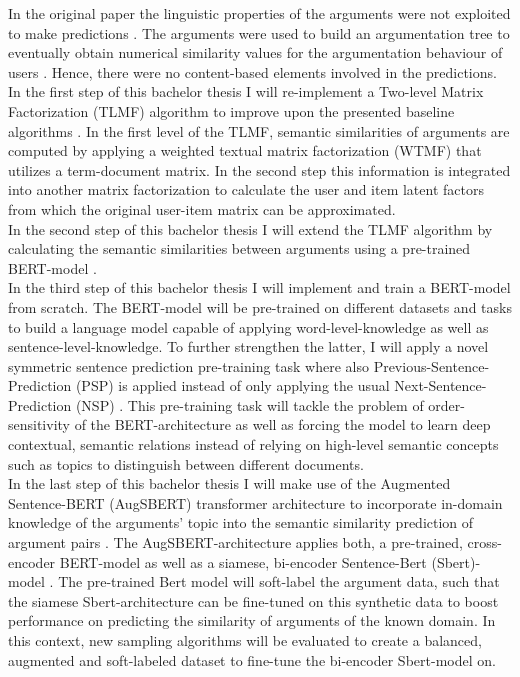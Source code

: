 In the original paper the linguistic properties of the arguments were not exploited to make predictions \cite{HowIArgue}. 
The arguments were used to build an argumentation tree to eventually obtain numerical similarity
values for the argumentation behaviour of users \cite{brenneis2020much}. Hence, there were no content-based elements involved
in the predictions.\\ 
In the first step of this bachelor thesis I will re-implement a Two-level Matrix Factorization (TLMF) algorithm to improve upon the presented baseline algorithms \cite{li2016two}.
In the first level of the TLMF, semantic similarities of arguments are computed by applying a weighted textual matrix factorization (WTMF) that utilizes a term-document matrix.
In the second step this information is integrated into another matrix factorization to calculate the
user and item latent factors from which the original user-item matrix can be approximated.\\
In the second step of this bachelor thesis I will extend the TLMF algorithm by calculating the semantic similarities between arguments using 
a pre-trained BERT-model \cite{devlin2018bert}.\\
In the third step of this bachelor thesis I will implement and train a BERT-model from scratch. The BERT-model will be pre-trained on different datasets and tasks to build a language model 
capable of applying word-level-knowledge as well as sentence-level-knowledge. To further strengthen the latter, I will apply a novel symmetric sentence prediction pre-training 
task where also Previous-Sentence-Prediction (PSP) is applied instead of only applying the usual Next-Sentence-Prediction (NSP) \cite{xu2020symmetric}.
This pre-training task will tackle the problem of order-sensitivity of the BERT-architecture as well as forcing the model to learn deep contextual, semantic relations instead
of relying on high-level semantic concepts such as topics to distinguish between different documents.\\
In the last step of this bachelor thesis I will make use of the Augmented Sentence-BERT (AugSBERT) transformer architecture to incorporate
in-domain knowledge of the arguments' topic into the semantic similarity prediction of argument pairs \cite{thakur2020augmented}.
The AugSBERT-architecture applies both, a pre-trained, cross-encoder BERT-model as well as a siamese, bi-encoder Sentence-Bert (Sbert)-model \cite{reimers2019sentence}.
The pre-trained Bert model will soft-label the argument data, such that the siamese Sbert-architecture can be fine-tuned
on this synthetic data to boost performance on predicting the similarity of arguments of the known domain.
In this context, new sampling algorithms will be evaluated to create a balanced, augmented and soft-labeled dataset to fine-tune the
bi-encoder Sbert-model on.
